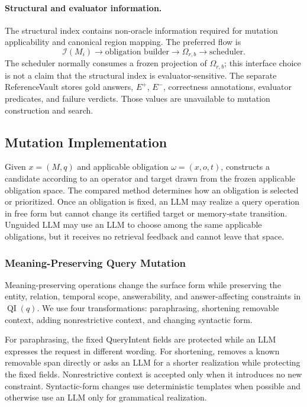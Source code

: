 \paragraph{Structural and evaluator information.}
The structural index contains non-oracle information required for mutation
applicability and canonical region mapping. The preferred flow is
\[
\mathcal{I}(M_i)\longrightarrow
\text{obligation builder}\longrightarrow
\Omega_{r,b}\longrightarrow
\text{scheduler}.
\]
The scheduler normally consumes a frozen projection of
\(\Omega_{r,b}\); this interface choice is not a claim that the structural
index is evaluator-sensitive. The separate ReferenceVault stores gold answers,
\(E^{+}\), \(E^{-}\), correctness annotations, evaluator predicates, and
failure verdicts. Those values are unavailable to mutation construction and
search.

\subsection{Mutation Implementation}
\label{app:mutation-implementation}

Given \(x=(M,q)\) and applicable obligation \(\omega=(x,o,t)\), \system
constructs a candidate according to an operator and target drawn from the
frozen applicable obligation space. The compared method determines how an
obligation is selected or prioritized. Once an obligation is fixed, an LLM may
realize a query operation in free form but cannot change its certified target
or memory-state transition. Unguided LLM may use an LLM to choose among the
same applicable obligations, but it receives no retrieval feedback and cannot
leave that space.

\subsubsection{Meaning-Preserving Query Mutation}

Meaning-preserving operations change the surface form while preserving the
entity, relation, temporal scope, answerability, and answer-affecting
constraints in \(\operatorname{QI}(q)\). We use four transformations:
paraphrasing, shortening removable context, adding nonrestrictive context, and
changing syntactic form.

For paraphrasing, the fixed QueryIntent fields are protected while an LLM
expresses the request in different wording. For shortening, \system removes a
known removable span directly or asks an LLM for a shorter realization while
protecting the fixed fields. Nonrestrictive context is accepted only when it
introduces no new constraint. Syntactic-form changes use deterministic
templates when possible and otherwise use an LLM only for grammatical
realization.

